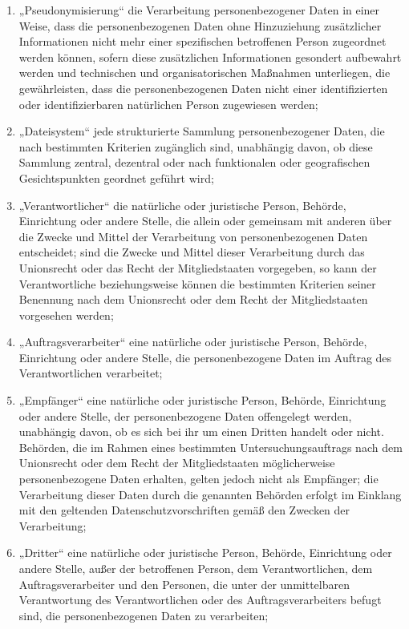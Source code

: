 \begin{enumerate}
  \item „Pseudonymisierung“ die Verarbeitung personenbezogener Daten in einer Weise, dass die personenbezogenen Daten
   ohne Hinzuziehung zusätzlicher Informationen nicht mehr einer spezifischen betroffenen Person zugeordnet werden
   können, sofern diese zusätzlichen Informationen gesondert aufbewahrt werden und technischen und organisatorischen
   Maßnahmen unterliegen, die gewährleisten, dass die personenbezogenen Daten nicht einer identifizierten oder
   identifizierbaren natürlichen Person zugewiesen werden;

  \item „Dateisystem“ jede strukturierte Sammlung personenbezogener Daten, die nach bestimmten Kriterien zugänglich
   sind, unabhängig davon, ob diese Sammlung zentral, dezentral oder nach funktionalen oder geografischen
   Gesichtspunkten geordnet geführt wird;

  \item „Verantwortlicher“ die natürliche oder juristische Person, Behörde, Einrichtung oder andere Stelle, die allein
   oder gemeinsam mit anderen über die Zwecke und Mittel der Verarbeitung von personenbezogenen Daten entscheidet; sind
   die Zwecke und Mittel dieser Verarbeitung durch das Unionsrecht oder das Recht der Mitgliedstaaten vorgegeben, so
   kann der Verantwortliche beziehungsweise können die bestimmten Kriterien seiner Benennung nach dem Unionsrecht oder
   dem Recht der Mitgliedstaaten vorgesehen werden;

  \item „Auftragsverarbeiter“ eine natürliche oder juristische Person, Behörde, Einrichtung oder andere Stelle, die
   personenbezogene Daten im Auftrag des Verantwortlichen verarbeitet;

  \item „Empfänger“ eine natürliche oder juristische Person, Behörde, Einrichtung oder andere Stelle, der
   personenbezogene Daten offengelegt werden, unabhängig davon, ob es sich bei ihr um einen Dritten handelt oder nicht.
   Behörden, die im Rahmen eines bestimmten Untersuchungsauftrags nach dem Unionsrecht oder dem Recht der
   Mitgliedstaaten möglicherweise personenbezogene Daten erhalten, gelten jedoch nicht als Empfänger; die Verarbeitung
   dieser Daten durch die genannten Behörden erfolgt im Einklang mit den geltenden Datenschutzvorschriften gemäß den
   Zwecken der Verarbeitung;

  \item „Dritter“ eine natürliche oder juristische Person, Behörde, Einrichtung oder andere Stelle, außer der
   betroffenen Person, dem Verantwortlichen, dem Auftragsverarbeiter und den Personen, die unter der unmittelbaren
   Verantwortung des Verantwortlichen oder des Auftragsverarbeiters befugt sind, die personenbezogenen Daten zu
   verarbeiten;


\end{enumerate}
